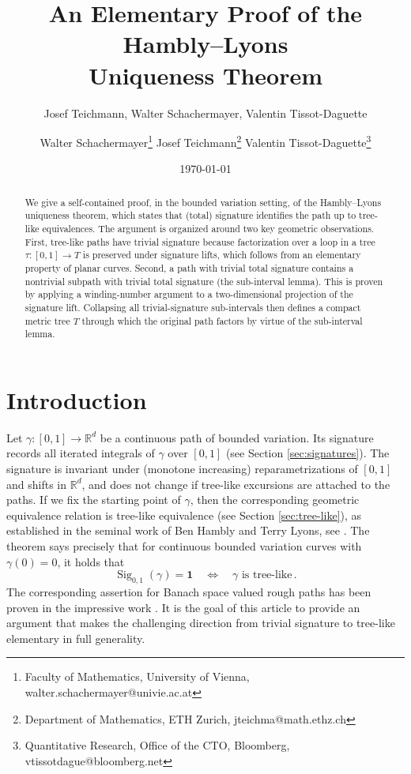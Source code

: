 \documentclass[11pt]{article}
\title{An Elementary Proof of the Hambly--Lyons \\ Uniqueness Theorem}
\author{Josef Teichmann, Walter Schachermayer, Valentin Tissot-Daguette}
\date{}
\author{
Walter Schachermayer\thanks{
  Faculty of Mathematics, University of Vienna, walter.schachermayer@univie.ac.at} \hspace{1em}
  Josef Teichmann\thanks{
  Department of Mathematics, ETH Zurich, jteichma@math.ethz.ch} \hspace{1em}
Valentin Tissot-Daguette\thanks{
  Quantitative Research, Office of the CTO, Bloomberg,  vtissotdague@bloomberg.net}  
}
\date{\today}
\theoremstyle{definition}
\newcommand{\R}{\mathbb{R}}
\newcommand{\Sig}{\operatorname{Sig}}
\newcommand{\id}{\mathbf{1}}
\begin{document}
\maketitle

\begin{abstract}
We give a self-contained proof, in the bounded variation setting, of the Hambly--Lyons uniqueness theorem, which states that (total) signature identifies the path up to tree-like equivalences. The argument is organized around two key 
 geometric observations. First, tree-like paths have trivial signature because factorization over a loop in a tree $\tau:[0,1]\to T$ is preserved under signature lifts, which follows from an elementary property of planar curves. 
Second, a path with trivial total signature contains a nontrivial subpath with trivial total signature (the sub-interval lemma). This is proven by applying a winding-number argument to a two-dimensional projection of the signature lift.  
Collapsing all trivial-signature sub-intervals then defines a compact metric tree $T$ through which the original path factors by virtue of the sub-interval lemma.
\end{abstract}

\section{Introduction}

Let \(\gamma:[0,1]\to\R^d\) be a continuous path of bounded variation. Its signature records all iterated integrals of \(\gamma\) over $[0,1]$ (see Section \ref{sec:signatures}). The signature is invariant under (monotone increasing) reparametrizations of $[0,1]$ and shifts in $\mathbb{R}^d$, and does not change %
if tree-like excursions are attached to the paths. If we fix the starting point of $\gamma$, then the corresponding geometric equivalence relation is tree-like equivalence (see Section \ref{sec:tree-like}), as established in  the  seminal work of Ben Hambly and Terry Lyons, see \cite{HL2010}. The theorem says precisely that for continuous bounded variation curves with $\gamma(0)=0$,  
it holds that
\[
  \Sig_{0,1}(\gamma)= \id
  \quad\Longleftrightarrow\quad
  \gamma \text{ is tree-like} \, .
\]
The corresponding assertion for Banach space valued rough paths has been proven in the impressive work \cite{BGLY2016}. It is the goal of this article to provide an argument that makes the challenging direction from trivial signature to tree-like elementary in full generality.
\end{document}

